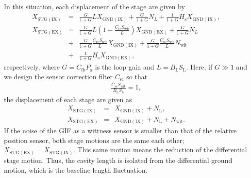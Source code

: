 In this situation, each displacement of the stage are given by 
\begin{eqnarray}
  X_{\mathrm{STG(IX)}} &=& \displaystyle\frac{G}{1+G} {L}X_{\mathrm{GND(IX)}} + \frac{G}{1+G} N_{L} + \frac{1}{1+G} H_{\mathrm{s}} X_{\mathrm{GND(IX)}}, \\ \nonumber
  X_{\mathrm{STG(EX)}} &=& \displaystyle\frac{G}{1+G} L\left(1- \frac{C_{\mathrm{sc}}S_{\mathrm{wit}}}{L}\right) X_{\mathrm{GND(EX)}} + \frac{G}{1+G}N_{L} \\ \nonumber
  &+& \frac{G}{1+G} \frac{C_{\mathrm{sc}}S_{\mathrm{wit}}}{L} X_{\mathrm{GND(IX)}}
  + \frac{G}{1+G} \frac{C_{\mathrm{sc}}S_{\mathrm{wit}}}{L} N_{\mathrm{wit}}\\ 
  &+& \frac{1}{1+G} H_{\mathrm{s}} X_{\mathrm{GND(EX)}},
\end{eqnarray}
respectively, where $G=C_{\mathrm{fb}}P_{\mathrm{a}}$ is the loop gain and $L=B_{\mathrm{L}}S_{\mathrm{L}}$. Here, if $G\gg1$ and we design the sensor correction filter $C_{\mathrm{sc}}$ so that
\begin{eqnarray}
  \frac{C_{\mathrm{sc}}S_{\mathrm{wit}}}{B_{\mathrm{L}}S_{\mathrm{L}}} = 1,
\end{eqnarray}
the displacement of each stage are given as 
\begin{eqnarray}
  X_{\mathrm{STG(IX)}} &=& X_{\mathrm{GND(IX)}} + N_{\mathrm{L}},\\
  X_{\mathrm{STG(EX)}} &=& X_{\mathrm{GND(IX)}} + N_{\mathrm{L}} + N_{\mathrm{wit}}.
\end{eqnarray}
If the noise of the GIF as a wittness sensor is smaller than that of the relative position sensor, both stage motions are the same each other; $X_{\mathrm{STG(EX)}}=X_{\mathrm{STG(IX)}}$. This same motion means the reduction of the differential stage motion. Thus, the cavity length is isolated from the differential ground motion, which is the baseline length fluctuation.


